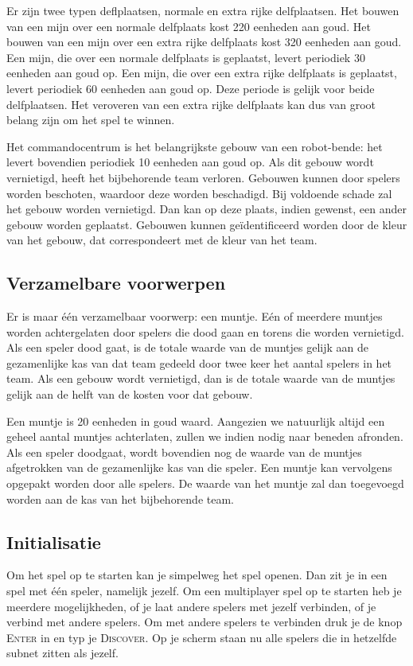     Er zijn twee typen deflplaatsen, normale en extra rijke delfplaatsen. Het bouwen van een mijn over een normale delfplaats kost 220 eenheden aan goud. Het bouwen van een mijn over een extra rijke delfplaats kost 320 eenheden aan goud. Een mijn, die over een normale delfplaats is geplaatst, levert periodiek 30 eenheden aan goud op. Een mijn, die over een extra rijke delfplaats is geplaatst, levert periodiek 60 eenheden aan goud op. Deze periode is gelijk voor beide delfplaatsen. Het veroveren van een extra rijke delfplaats kan dus van groot belang zijn om het spel te winnen.

    Het commandocentrum is het belangrijkste gebouw van een robot-bende: het levert bovendien periodiek 10 eenheden aan goud op. Als dit gebouw wordt vernietigd, heeft het bijbehorende team verloren. Gebouwen kunnen door spelers worden beschoten, waardoor deze worden beschadigd. Bij voldoende schade zal het gebouw worden vernietigd. Dan kan op deze plaats, indien gewenst, een ander gebouw worden geplaatst. Gebouwen kunnen ge\"identificeerd worden door de kleur van het gebouw, dat correspondeert met de kleur van het team.

    \subsection{Verzamelbare voorwerpen}
    Er is maar \'e\'en verzamelbaar voorwerp: een muntje. E\'en of meerdere muntjes worden achtergelaten door spelers die dood gaan en torens die worden vernietigd. Als een speler dood gaat, is de totale waarde van de muntjes gelijk aan de gezamenlijke kas van dat team gedeeld door twee keer het aantal spelers in het team. Als een gebouw wordt vernietigd, dan is de totale waarde van de muntjes gelijk aan de helft van de kosten voor dat gebouw.

    Een muntje is 20 eenheden in goud waard. Aangezien we natuurlijk altijd een geheel aantal muntjes achterlaten, zullen we indien nodig naar beneden afronden. Als een speler doodgaat, wordt bovendien nog de waarde van de muntjes afgetrokken van de gezamenlijke kas van die speler. Een muntje kan vervolgens opgepakt worden door alle spelers. De waarde van het muntje zal dan toegevoegd worden aan de kas van het bijbehorende team.

    \subsection{Initialisatie}
	Om het spel op te starten kan je simpelweg het spel openen. Dan zit je in een spel met \'e\'en speler, namelijk jezelf. Om een multiplayer spel op te starten heb je meerdere mogelijkheden, of je laat andere spelers met jezelf verbinden, of je verbind met andere spelers. Om met andere spelers te verbinden druk je de knop \textsc{Enter} in en typ je \textsc{Discover}. Op je scherm staan nu alle spelers die in hetzelfde subnet zitten als jezelf. 
	
